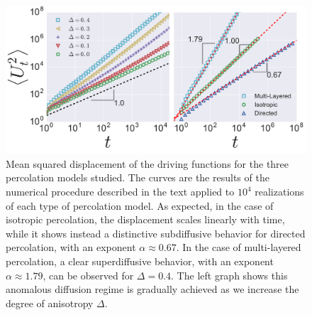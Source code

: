 \begin{figure}
\begin{center}
    \includegraphics[width=\textwidth]{chapters/ch6-asle/figs/diffusion}
\end{center}
\caption{Mean squared displacement of the driving functions for the three
    percolation models studied. The curves are the results of the numerical
    procedure described in the text applied to $10^4$ realizations of each type
    of percolation model. As expected, in the case of isotropic percolation,
    the displacement scales linearly with time, while it shows instead a
    distinctive subdiffusive behavior for directed percolation, with an
    exponent $\alpha\approx0.67$. In the case of multi-layered percolation, a
    clear superdiffusive behavior, with an exponent $\alpha\approx1.79$, can be
    observed for $\Delta=0.4$. The left graph shows this anomalous diffusion
    regime is gradually achieved as we increase the degree of anisotropy
    $\Delta$.}
\label{fig:diffusion}
\end{figure}


